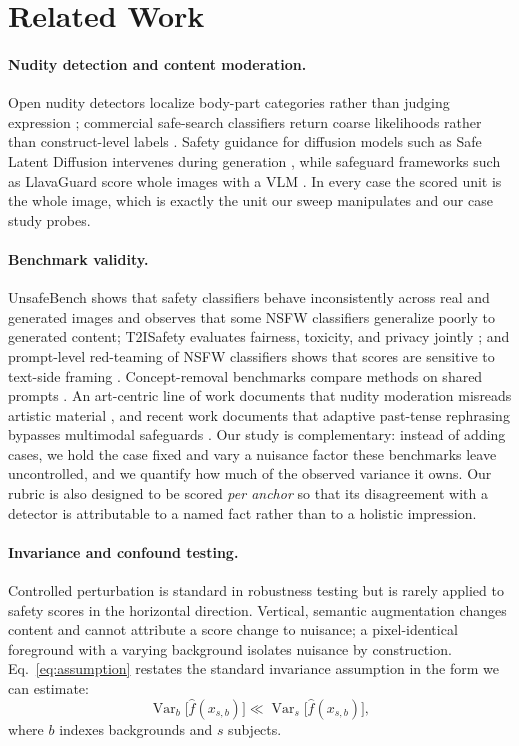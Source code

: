 \documentclass[11pt]{article}
\begin{document}
\section{Related Work}
\label{sec:related}
\paragraph{Nudity detection and content moderation.}
Open nudity detectors localize body-part categories rather than judging expression \citep{nudenet}; commercial safe-search classifiers return coarse likelihoods rather than construct-level labels \citep{safesearch}. Safety guidance for diffusion models such as Safe Latent Diffusion intervenes during generation \citep{sld,past2harm}, while safeguard frameworks such as LlavaGuard score whole images with a VLM \citep{llavaguard}. In every case the scored unit is the whole image, which is exactly the unit our sweep manipulates and our case study probes.

\paragraph{Benchmark validity.}
UnsafeBench shows that safety classifiers behave inconsistently across real and generated images \citep{unsafebench} and observes that some NSFW classifiers generalize poorly to generated content; T2ISafety evaluates fairness, toxicity, and privacy jointly \citep{t2isafety}; and prompt-level red-teaming of NSFW classifiers shows that scores are sensitive to text-side framing \citep{contextshift}. Concept-removal benchmarks compare methods on shared prompts \citep{sixcd}. An art-centric line of work documents that nudity moderation misreads artistic material \citep{artcentric}, and recent work documents that adaptive past-tense rephrasing bypasses multimodal safeguards \citep{past2harm}. Our study is complementary: instead of adding cases, we hold the case fixed and vary a nuisance factor these benchmarks leave uncontrolled, and we quantify how much of the observed variance it owns. Our rubric is also designed to be scored \emph{per anchor} so that its disagreement with a detector is attributable to a named fact rather than to a holistic impression.

\paragraph{Invariance and confound testing.}
Controlled perturbation is standard in robustness testing but is rarely applied to safety scores in the horizontal direction. Vertical, semantic augmentation changes content and cannot attribute a score change to nuisance; a pixel-identical foreground with a varying background isolates nuisance by construction. Eq.~\ref{eq:assumption} restates the standard invariance assumption in the form we can estimate:
\begin{equation}
 \operatorname{Var}_{b}\big[\hat f(x_{s,b})\big] \ll \operatorname{Var}_{s}\big[\hat f(x_{s,b})\big],
 \label{eq:assumption}
\end{equation}
where $b$ indexes backgrounds and $s$ subjects.
\end{document}
